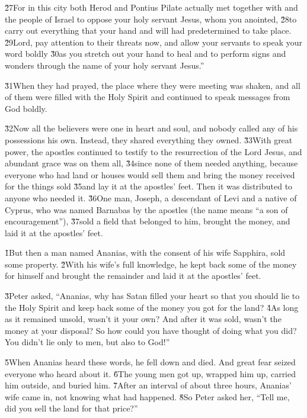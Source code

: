 \v{27}For in this city both Herod and Pontius Pilate actually met together with  and the people of Israel to oppose your holy servant Jesus, whom you anointed, \v{28}to carry out everything that your hand and will had predetermined to take place. \v{29}Lord, pay attention to their threats now, and allow your servants to speak your word boldly \v{30}as you stretch out your hand to heal and to perform signs and wonders through the name of your holy servant Jesus.''

\v{31}When they had prayed, the place where they were meeting was shaken, and all of them were filled with the Holy Spirit and continued to speak messages from God boldly.

\v{32}Now all the believers were one in heart and soul, and nobody called any of his possessions his own. Instead, they shared everything they owned. \v{33}With great power, the apostles continued to testify to the resurrection of the Lord Jesus, and abundant grace was on them all, \v{34}since none of them needed anything, because everyone who had land or houses would sell them and bring the money received for the things sold \v{35}and lay it at the apostles' feet. Then it was distributed to anyone who needed it. \v{36}One man, Joseph, a descendant of Levi and a native of Cyprus, who was named Barnabas by the apostles (the name means ``a son of encouragement''), \v{37}sold a field that belonged to him, brought the money, and laid it at the apostles' feet.

\v{1}But then a man named Ananias, with the consent of his wife Sapphira, sold some property. \v{2}With his wife's full knowledge, he kept back some of the money for himself and brought the remainder and laid it at the apostles' feet.

\v{3}Peter asked, ``Ananias, why has Satan filled your heart so that you should lie to the Holy Spirit and keep back some of the money you got for the land? \v{4}As long as it remained unsold, wasn't it your own? And after it was sold, wasn't the money at your disposal? So how could you have thought of doing what you did? You didn't lie only to men, but also to God!''

\v{5}When Ananias heard these words, he fell down and died. And great fear seized everyone who heard about it. \v{6}The young men got up, wrapped him up, carried him outside, and buried him. \v{7}After an interval of about three hours, Ananias' wife came in, not knowing what had happened. \v{8}So Peter asked her, ``Tell me, did you sell the land for that price?''

